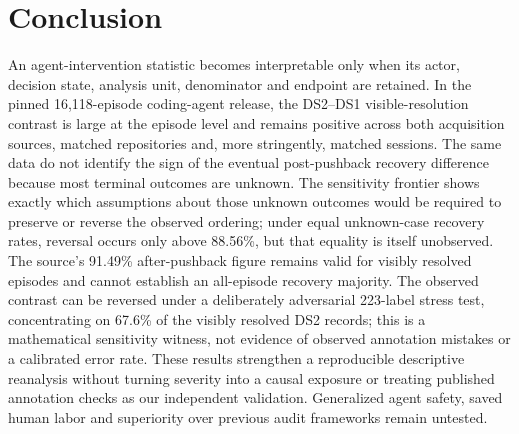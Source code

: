\section{Conclusion}
An agent-intervention statistic becomes interpretable only when its actor, decision state, analysis unit, denominator and endpoint are retained. In the pinned 16,118-episode coding-agent release, the DS2--DS1 visible-resolution contrast is large at the episode level and remains positive across both acquisition sources, matched repositories and, more stringently, matched sessions. The same data do not identify the sign of the eventual post-pushback recovery difference because most terminal outcomes are unknown. The sensitivity frontier shows exactly which assumptions about those unknown outcomes would be required to preserve or reverse the observed ordering; under equal unknown-case recovery rates, reversal occurs only above 88.56\%, but that equality is itself unobserved. The source's 91.49\% after-pushback figure remains valid for visibly resolved episodes and cannot establish an all-episode recovery majority. The observed contrast can be reversed under a deliberately adversarial 223-label stress test, concentrating on 67.6\% of the visibly resolved DS2 records; this is a mathematical sensitivity witness, not evidence of observed annotation mistakes or a calibrated error rate. These results strengthen a reproducible descriptive reanalysis without turning severity into a causal exposure or treating published annotation checks as our independent validation. Generalized agent safety, saved human labor and superiority over previous audit frameworks remain untested.

